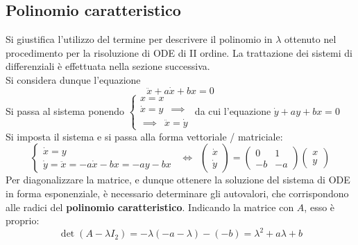 \documentclass[10pt]{article}
\theoremstyle{plain}
\begin{document}
\subsection{Polinomio caratteristico}
Si giustifica l'utilizzo del termine per descrivere il polinomio in $\lambda$ ottenuto nel procedimento per la risoluzione di ODE di II ordine. La trattazione dei sistemi di differenziali è effettuata nella sezione successiva.
\\Si considera dunque l'equazione
\[\ddot{x} + a \dot{x} + b x = 0\]
Si passa al sistema ponendo $\displaystyle \begin{cases}
x = x\\
\dot{x} = y \enspace \implies\\
\implies \enspace \ddot{x} = \dot{y}
\end{cases}$ da cui l'equazione $\dot{y} + a y + b x = 0$
\\Si imposta il sistema e si passa alla forma vettoriale / matriciale:
\[\begin{cases}
\dot{x} = y\\
\dot{y} = \ddot{x} = - a \dot{x} - b x = - a y - b x
\end{cases} \enspace \Leftrightarrow \enspace \begin{pmatrix}
\dot{x} \\
\dot{y}
\end{pmatrix} = \begin{pmatrix}
0 & 1 \\
- b & - a
\end{pmatrix} \begin{pmatrix}
x \\ y
\end{pmatrix}\]
Per diagonalizzare la matrice, e dunque ottenere la soluzione del sistema di ODE in forma esponenziale, è necessario determinare gli autovalori, che corrispondono alle radici del \textbf{polinomio caratteristico}. Indicando la matrice con $A$, esso è proprio:
\[\det(A - \lambda I_2) = - \lambda ( - a - \lambda) - (-b) = \lambda^2 + a \lambda + b\]
\end{document}
